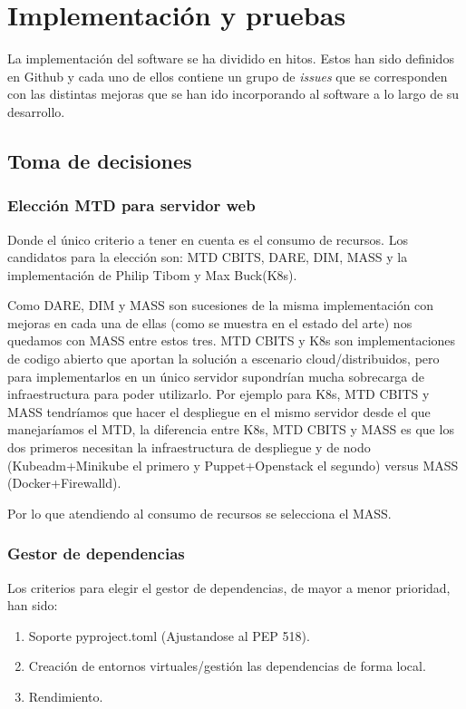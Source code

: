 \chapter{Implementación y pruebas}

La implementación del software se ha dividido en hitos. Estos han sido definidos en Github
y cada uno de ellos contiene un grupo de \textit{issues} que se corresponden con las distintas
mejoras que se han ido incorporando al software a lo largo de su desarrollo.

\section{Toma de decisiones}

\subsection{Elección MTD para servidor web}
Donde el único criterio a tener en cuenta es el consumo de recursos.
Los candidatos para la elección son: MTD CBITS, DARE, DIM, MASS y la implementación de Philip Tibom y Max Buck\cite{MTD-gotemburgo}(K8s).

Como DARE, DIM y MASS son sucesiones de la misma implementación con mejoras en cada una de ellas (como se muestra en el estado del arte) nos quedamos con MASS entre estos tres.
MTD CBITS y K8s son implementaciones de codigo abierto que aportan la solución a escenario cloud/distribuidos, pero para implementarlos en un único servidor supondrían mucha sobrecarga de infraestructura para poder utilizarlo. Por ejemplo para K8s, MTD CBITS y MASS tendríamos que hacer el despliegue en el mismo servidor desde el que manejaríamos el MTD, la diferencia entre K8s, MTD CBITS y MASS es que los dos primeros necesitan la infraestructura de despliegue y de nodo (Kubeadm+Minikube el primero y Puppet+Openstack el segundo) versus MASS (Docker+Firewalld). 

Por lo que atendiendo al consumo de recursos se selecciona el MASS.

\subsection{Gestor de dependencias}
Los criterios para elegir el gestor de dependencias, de mayor a menor prioridad, han sido:
\begin{enumerate}
    \item Soporte pyproject.toml (Ajustandose al PEP 518\cite{pep-pyproject}).
    \item Creación de entornos virtuales/gestión las dependencias de forma local.
    \item Rendimiento.
\end{enumerate}


